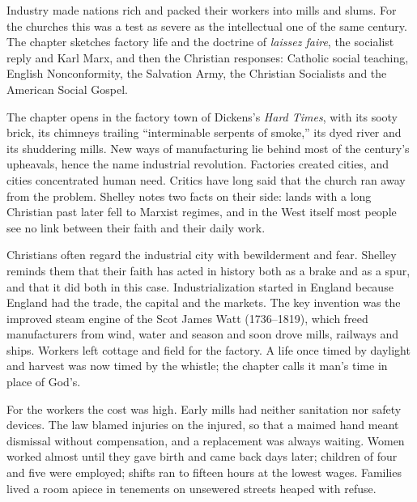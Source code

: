 
\begin{inbrief}
Industry made nations rich and packed their workers into mills and slums. For the churches this was a
test as severe as the intellectual one of the same century. The chapter sketches factory life and the
doctrine of \emph{laissez faire}, the socialist reply and Karl Marx, and then the Christian
responses: Catholic social teaching, English Nonconformity, the Salvation Army, the Christian
Socialists and the American Social Gospel.
\end{inbrief}

The chapter opens in the factory town of Dickens's \emph{Hard Times}, with its sooty brick, its
chimneys trailing ``interminable serpents of smoke,'' its dyed river and its shuddering mills. New
ways of manufacturing lie behind most of the century's upheavals, hence the name industrial
revolution. Factories created cities, and cities concentrated human need. Critics have long said that
the church ran away from the problem. Shelley notes two facts on their side: lands with a long
Christian past later fell to Marxist regimes, and in the West itself most people see no link between
their faith and their daily work.

Christians often regard the industrial city with bewilderment and fear. Shelley reminds them that
their faith has acted in history both as a brake and as a spur, and that it did both in this case.
Industrialization started in England because England had the trade, the capital and the markets. The
key invention was the improved steam engine of the Scot James Watt (1736--1819), which freed
manufacturers from wind, water and season and soon drove mills, railways and ships. Workers left
cottage and field for the factory. A life once timed by daylight and harvest was now timed by the
whistle; the chapter calls it man's time in place of God's.

For the workers the cost was high. Early mills had neither sanitation nor safety devices. The law
blamed injuries on the injured, so that a maimed hand meant dismissal without compensation, and a
replacement was always waiting. Women worked almost until they gave birth and came back days later;
children of four and five were employed; shifts ran to fifteen hours at the lowest wages. Families
lived a room apiece in tenements on unsewered streets heaped with refuse.

